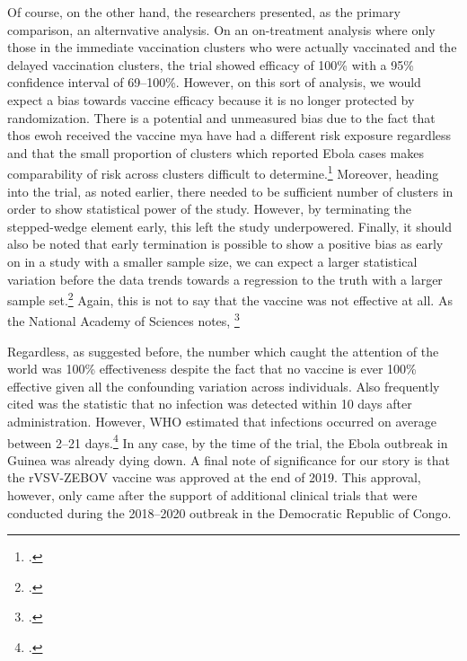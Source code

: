 \documentclass[letterpaper,notitlepage,12pt]{article}
\begin{document}
Of course, on the other hand, the researchers presented, as the primary
comparison, an alternvative analysis.
On an on-treatment analysis where only those in the immediate vaccination
clusters who were actually vaccinated and the delayed vaccination clusters, the
trial showed efficacy of 100\% with a 95\% confidence interval of 69--100\%.
However, on this sort of analysis, we would expect a bias towards vaccine
efficacy because it is no longer protected by randomization.
There is a potential and unmeasured bias due to the fact that thos ewoh received
the vaccine mya have had a different risk exposure regardless and that the small
proportion of clusters which reported Ebola cases makes comparability of risk
across clusters difficult to determine.\footcite[p. 129]{NAP}
Moreover, heading into the trial, as noted earlier, there needed to be
sufficient number of clusters in order to show statistical power of the study.
However, by terminating the stepped-wedge element early, this left the study
underpowered.
Finally, it should also be noted that early termination is possible to show a
positive bias as early on in a study with a smaller sample size, we can expect a
larger statistical variation before the data trends towards a regression to the
truth with a larger sample set.\footcite{handbook}
Again, this is not to say that the vaccine was not effective at all.
As the National Academy of Sciences notes, \footcite[p.
128]{NAP}

Regardless, as suggested before, the number which caught the attention of the
world was 100\% effectiveness despite the fact that no vaccine is ever 100\%
effective given all the confounding variation across individuals.
Also frequently cited was the statistic that no infection was detected within 10
days after administration.
However, WHO estimated that infections occurred on average between 2--21
days.\footcite{Bosclay 2016}
In any case, by the time of the trial, the Ebola outbreak in Guinea was already
dying down.
A final note of significance for our story is that the rVSV-ZEBOV vaccine was
approved at the end of 2019.
This approval, however, only came after the support of additional clinical
trials that were conducted during the 2018--2020 outbreak in the Democratic
Republic of Congo.
\end{document}
